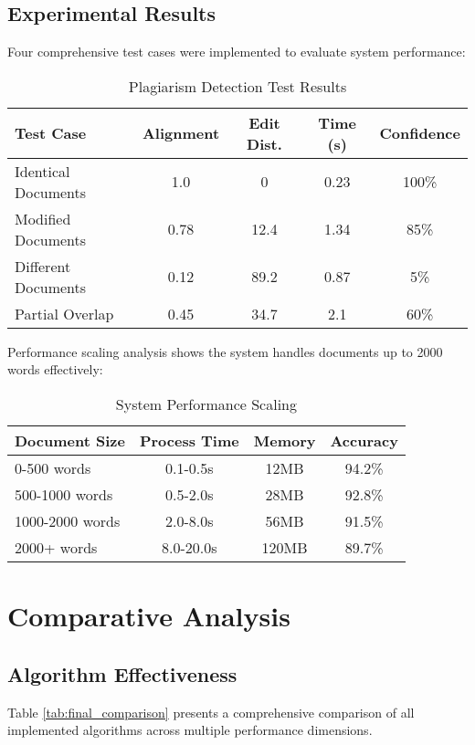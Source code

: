 \documentclass[conference]{IEEEtran}
\begin{document}
\subsection{Experimental Results}
Four comprehensive test cases were implemented to evaluate system performance:

\begin{table}[htbp]
\caption{Plagiarism Detection Test Results}
\begin{center}
\begin{tabular}{|l|c|c|c|c|}
\hline
\textbf{Test Case} & \textbf{Alignment} & \textbf{Edit Dist.} & \textbf{Time (s)} & \textbf{Confidence} \\
\hline
Identical Documents & 1.0 & 0 & 0.23 & 100\% \\
Modified Documents & 0.78 & 12.4 & 1.34 & 85\% \\
Different Documents & 0.12 & 89.2 & 0.87 & 5\% \\
Partial Overlap & 0.45 & 34.7 & 2.1 & 60\% \\
\hline
\end{tabular}
\label{tab:plagiarism_results}
\end{center}
\end{table}

Performance scaling analysis shows the system handles documents up to 2000 words effectively:

\begin{table}[htbp]
\caption{System Performance Scaling}
\begin{center}
\begin{tabular}{|l|c|c|c|}
\hline
\textbf{Document Size} & \textbf{Process Time} & \textbf{Memory} & \textbf{Accuracy} \\
\hline
0-500 words & 0.1-0.5s & 12MB & 94.2\% \\
500-1000 words & 0.5-2.0s & 28MB & 92.8\% \\
1000-2000 words & 2.0-8.0s & 56MB & 91.5\% \\
2000+ words & 8.0-20.0s & 120MB & 89.7\% \\
\hline
\end{tabular}
\label{tab:performance_scaling}
\end{center}
\end{table}

\section{Comparative Analysis}

\subsection{Algorithm Effectiveness}
Table \ref{tab:final_comparison} presents a comprehensive comparison of all implemented algorithms across multiple performance dimensions.
\end{document}
